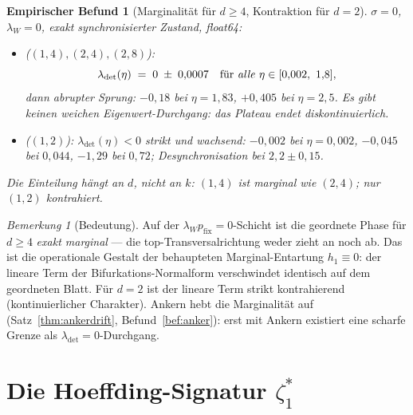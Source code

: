 \documentclass[11pt,a4paper]{article}
\newtheorem{befund}{Empirischer Befund}
\theoremstyle{remark}
\newtheorem{bemerkung}{Bemerkung}
\begin{document}
\begin{befund}[Marginalität für $d\ge4$, Kontraktion für $d=2$]\label{bef:marginal}
$\sigma=0$, $\lambda_W=0$, exakt synchronisierter Zustand, float64:
\begin{itemize}
\item[$d\ge4$] ($(1,4),(2,4),(2,8)$):
\[
\lambda_{\mathrm{det}}(\eta)\;=\;0\;\pm\;0{,}0007
\quad\text{für \emph{alle}}\ \eta\in[0{,}002,\ 1{,}8],
\]
dann \emph{abrupter} Sprung: $-0{,}18$ bei $\eta=1{,}83$, $+0{,}405$ bei
$\eta=2{,}5$. Es gibt keinen weichen Eigenwert-Durchgang: das Plateau
endet diskontinuierlich.
\item[$d=2$] ($(1,2)$):
$\lambda_{\mathrm{det}}(\eta)<0$ strikt und wachsend:
$-0{,}002$ bei $\eta=0{,}002$, $-0{,}045$ bei $0{,}044$,
$-1{,}29$ bei $0{,}72$; Desynchronisation bei $2{,}2\pm0{,}15$.
\end{itemize}
Die Einteilung hängt an $d$, nicht an $k$: $(1,4)$ ist marginal wie
$(2,4)$; nur $(1,2)$ kontrahiert.
\end{befund}

\begin{bemerkung}[Bedeutung]
Auf der $\lambda_Wp_{\mathrm{fix}}=0$-Schicht ist die geordnete Phase für
$d\ge4$ \emph{exakt marginal} --- die top-Transversalrichtung weder zieht
an noch ab. Das ist die operationale Gestalt der behaupteten
Marginal-Entartung $h_1\equiv0$: der lineare Term der Bifurkations-Normalform
verschwindet identisch auf dem geordneten Blatt. Für $d=2$ ist der lineare
Term strikt kontrahierend (kontinuierlicher Charakter). Ankern hebt die
Marginalität auf (Satz~\ref{thm:ankerdrift}, Befund~\ref{bef:anker}):
erst mit Ankern existiert eine scharfe Grenze als
$\lambda_{\mathrm{det}}=0$-Durchgang.
\end{bemerkung}

\section{Die Hoeffding-Signatur $\zeta_1^\ast$}
\end{document}
